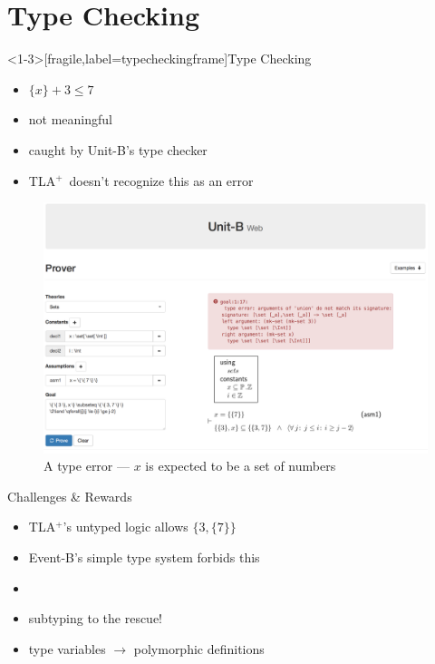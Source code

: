 \documentclass[11pt]{beamer}
\newcommand{\unitb}{Unit-B\xspace}
\newcommand{\eventb}{Event-B\xspace}
\newcommand{\tla}{TLA${}^+$\xspace}
\begin{document}
\section{Type Checking}

\begin{frame}<1-3>[fragile,label=typecheckingframe]{Type Checking}
  \begin{itemize}
  \item <1-> $\{x\}+3 \le 7$
  \item <2-> not meaningful
  \item <3-> caught by \unitb's type checker
  \item <4-> \tla\ doesn't recognize this as an error
  \end{itemize}
\end{frame}

\begin{frame}[plain]
  \begin{figure}
    \centering
    \includegraphics[width=\textwidth]{img/unitb_typechecking.png}
    \caption{A type error --- $x$ is expected to be a set of
      numbers}\label{fig:typechecking}
  \end{figure}
\end{frame}


\begin{frame}[fragile]{Challenges \& Rewards}
  \begin{itemize}[<+->]
  \item \tla's untyped logic allows $\{3, \{7\}\}$
  \item \eventb's simple type system forbids this
  \item {}
  \item \alert{\large subtyping} to the rescue!
  \item type variables $\rightarrow$ polymorphic definitions
  \end{itemize}
\end{frame}
\end{document}
